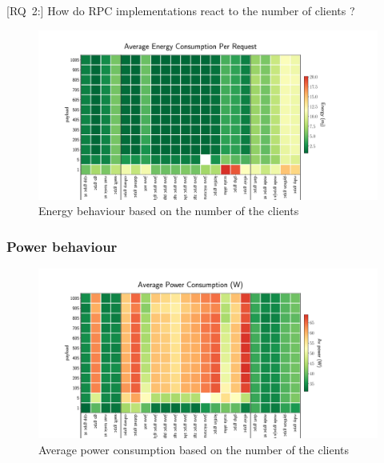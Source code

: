 [\textsc{RQ}~2:] How do RPC implementations react to the number of clients ?
\begin{figure}[!hbt]
    \begin{center}
        \includegraphics[width=1.2\linewidth]{imgs/energy_cost_clients}
    \end{center}
    \caption{Energy behaviour based on the number of the clients}\label{fig:rpcproenergy_cost_clients}
\end{figure}

\subsubsection{Power behaviour}

\begin{figure}[!hbt]
    \begin{center}
        \includegraphics[width=1.2\linewidth]{imgs/power_consumption_clients}
    \end{center}
    \caption{Average power consumption based on the number of the clients}\label{fig:power_consumption_clients}
\end{figure}

